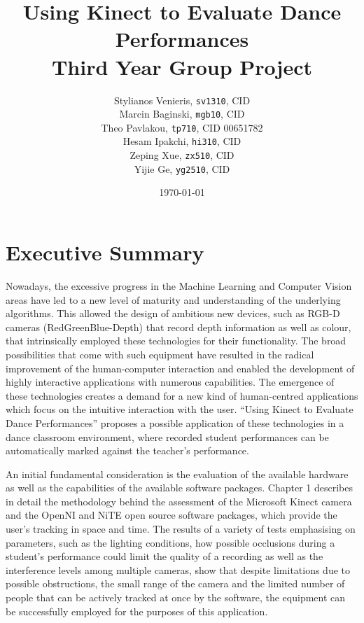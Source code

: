 \documentclass[11pt,a4paper]{article}
\begin{document}
\title{Using Kinect to Evaluate Dance Performances\\ Third Year Group Project}
\author{Stylianos Venieris, \texttt{sv1310}, CID \\
Marcin Baginski, \texttt{mgb10}, CID \\
Theo Pavlakou, \texttt{tp710}, CID 00651782\\
Hesam Ipakchi, \texttt{hi310}, CID \\
Zeping Xue, \texttt{zx510}, CID \\
Yijie Ge, \texttt{yg2510}, CID }
\date{\today}
\maketitle
{}
\newpage


\section*{\center Executive Summary}
Nowadays, the excessive progress in the Machine Learning and Computer Vision areas have led to a new level of maturity and understanding of the underlying algorithms. This allowed the design of ambitious new devices, such as RGB-D cameras (RedGreenBlue-Depth) that record depth information as well as colour, that intrinsically employed these technologies for their functionality. The broad possibilities that come with such equipment have resulted in the radical improvement of the human-computer interaction and enabled the development of highly interactive applications with numerous capabilities. The emergence of these technologies creates a demand for a new kind of human-centred applications which focus on the intuitive interaction with the user. “Using Kinect to Evaluate Dance Performances” proposes a possible application of these technologies in a dance classroom environment, where recorded student performances can be automatically marked against the teacher’s performance.

\noindent
An initial fundamental consideration is the evaluation of the available hardware as well as the capabilities of the available software packages. Chapter 1 describes in detail the methodology behind the assessment of the Microsoft Kinect camera and the OpenNI and NiTE open source software packages, which provide the user’s tracking in space and time. The results of a variety of tests emphasising on parameters, such as the lighting conditions, how possible occlusions during a student’s performance could limit the quality of a recording as well as the interference levels among multiple cameras, show that despite limitations due to possible obstructions, the small range of the camera and the limited number of people that can be actively tracked at once by the software, the equipment can be successfully employed for the purposes of this application.
\end{document}
